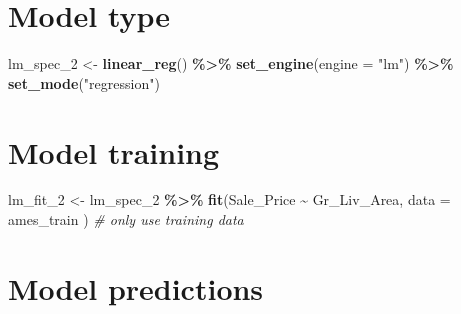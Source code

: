 \documentclass[
]{book}
\newenvironment{Shaded}{\begin{snugshade}}{\end{snugshade}}
\newcommand{\CommentTok}[1]{\textcolor[rgb]{0.56,0.35,0.01}{\textit{#1}}}
\newcommand{\DataTypeTok}[1]{\textcolor[rgb]{0.13,0.29,0.53}{#1}}
\newcommand{\DecValTok}[1]{\textcolor[rgb]{0.00,0.00,0.81}{#1}}
\newcommand{\KeywordTok}[1]{\textcolor[rgb]{0.13,0.29,0.53}{\textbf{#1}}}
\newcommand{\NormalTok}[1]{#1}
\newcommand{\OperatorTok}[1]{\textcolor[rgb]{0.81,0.36,0.00}{\textbf{#1}}}
\newcommand{\StringTok}[1]{\textcolor[rgb]{0.31,0.60,0.02}{#1}}
\begin{document}
\hypertarget{model-type-1}{%
\section{Model type}\label{model-type-1}}

\begin{Shaded}
\begin{Highlighting}[]
\NormalTok{lm\_spec\_}\DecValTok{2}\NormalTok{ \textless{}{-}}
\StringTok{  }\KeywordTok{linear\_reg}\NormalTok{() }\OperatorTok{\%\textgreater{}\%}
\StringTok{  }\KeywordTok{set\_engine}\NormalTok{(}\DataTypeTok{engine =} \StringTok{"lm"}\NormalTok{) }\OperatorTok{\%\textgreater{}\%}
\StringTok{  }\KeywordTok{set\_mode}\NormalTok{(}\StringTok{"regression"}\NormalTok{)}
\end{Highlighting}
\end{Shaded}

\hypertarget{model-training-1}{%
\section{Model training}\label{model-training-1}}

\begin{Shaded}
\begin{Highlighting}[]
\NormalTok{lm\_fit\_}\DecValTok{2}\NormalTok{ \textless{}{-}}
\StringTok{  }\NormalTok{lm\_spec\_}\DecValTok{2} \OperatorTok{\%\textgreater{}\%}
\StringTok{  }\KeywordTok{fit}\NormalTok{(Sale\_Price }\OperatorTok{\textasciitilde{}}\StringTok{ }\NormalTok{Gr\_Liv\_Area,}
    \DataTypeTok{data =}\NormalTok{ ames\_train}
\NormalTok{  ) }\CommentTok{\# only use training data}
\end{Highlighting}
\end{Shaded}

\hypertarget{model-predictions-1}{%
\section{Model predictions}\label{model-predictions-1}}

\begin{Shaded}
\end{Shaded}
\end{document}
